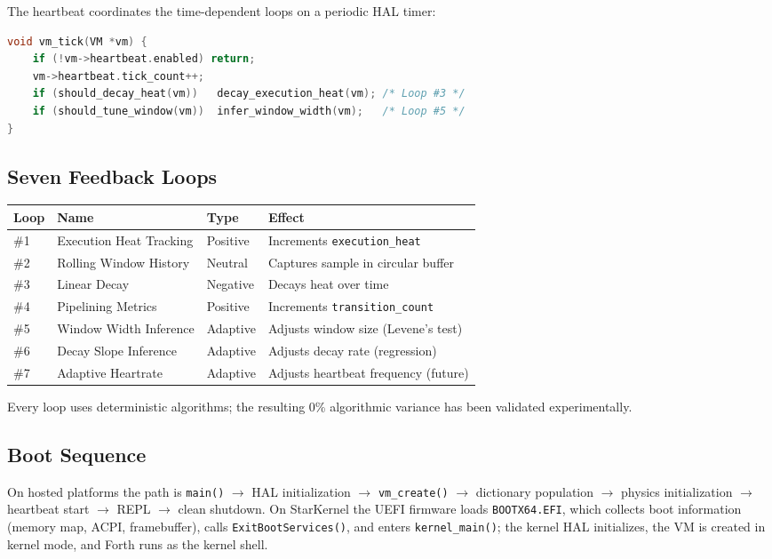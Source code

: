 The heartbeat coordinates the time-dependent loops on a periodic HAL timer:

\begin{lstlisting}[language=C]
void vm_tick(VM *vm) {
    if (!vm->heartbeat.enabled) return;
    vm->heartbeat.tick_count++;
    if (should_decay_heat(vm))   decay_execution_heat(vm); /* Loop #3 */
    if (should_tune_window(vm))  infer_window_width(vm);   /* Loop #5 */
}
\end{lstlisting}

\subsection{Seven Feedback Loops}

\begin{tabular}{llll}
\toprule
Loop & Name & Type & Effect \\
\midrule
\#1 & Execution Heat Tracking & Positive & Increments \texttt{execution\_heat} \\
\#2 & Rolling Window History & Neutral & Captures sample in circular buffer \\
\#3 & Linear Decay & Negative & Decays heat over time \\
\#4 & Pipelining Metrics & Positive & Increments \texttt{transition\_count} \\
\#5 & Window Width Inference & Adaptive & Adjusts window size (Levene's test) \\
\#6 & Decay Slope Inference & Adaptive & Adjusts decay rate (regression) \\
\#7 & Adaptive Heartrate & Adaptive & Adjusts heartbeat frequency (future) \\
\bottomrule
\end{tabular}

Every loop uses deterministic algorithms; the resulting 0\% algorithmic
variance has been validated experimentally.

\subsection{Boot Sequence}

On hosted platforms the path is \texttt{main()} $\rightarrow$ HAL
initialization $\rightarrow$ \texttt{vm\_create()} $\rightarrow$ dictionary
population $\rightarrow$ physics initialization $\rightarrow$ heartbeat start
$\rightarrow$ REPL $\rightarrow$ clean shutdown. On StarKernel the UEFI firmware
loads \texttt{BOOTX64.EFI}, which collects boot information (memory map, ACPI,
framebuffer), calls \texttt{ExitBootServices()}, and enters
\texttt{kernel\_main()}; the kernel HAL initializes, the VM is created in kernel
mode, and Forth runs as the kernel shell.

